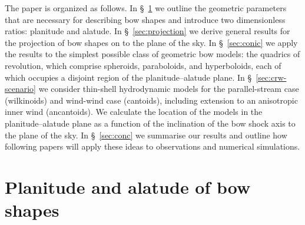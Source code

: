 

The paper is organized as follows.
%
In \S~\ref{sec:plan-alat-bow} we outline the geometric parameters that
are necessary for describing bow shapes and introduce two
dimensionless ratios: planitude and alatude.
%
In \S~\ref{sec:projection} we derive general results for the
projection of bow shapes on to the plane of the sky.
%
In \S~\ref{sec:conic} we apply the results to the simplest possible
class of geometric bow models: the quadrics of revolution, which
comprise spheroids, paraboloids, and hyperboloids, each of which
occupies a disjoint region of the planitude--alatude plane.
%
In \S~\ref{sec:crw-scenario} we consider thin-shell hydrodynamic
models for the parallel-stream case (wilkinoids) and wind-wind case
(cantoids), including extension to an anisotropic inner wind
(ancantoids).  We calculate the location of the models in the
planitude--alatude plane as a function of the inclination of the bow
shock axis to the plane of the sky.
In \S~\ref{sec:conc} we summarise our results and outline how
following papers will apply these ideas to observations and numerical
simulations.



\section{Planitude and alatude of bow shapes}
\label{sec:plan-alat-bow}


